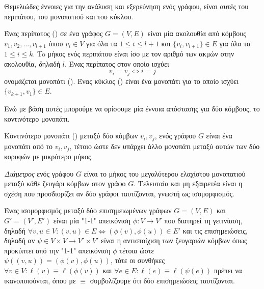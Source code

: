 Θεμελιώδες έννοιες για την ανάλυση και εξερεύνηση ενός γράφου, είναι αυτές του περιπάτου, του μονοπατιού και του κύκλου.
\begin{definition}
Ένας περίπατος () σε ένα γράφος $G = (V, E)$ είναι μία ακολουθία από κόμβους $v_{1}, v_{2}, \dots , v_{l + 1}$ όπου $v_{i} \in V$ για όλα τα $1 \leq i \leq l + 1$ και $\{ v_{i} , v_{i + 1} \} \in E$ για όλα τα
$1 \leq i \leq k$. To μήκος ενός περιπάτου είναι ίσο με τον αριθμό των ακμών στην ακολουθία, δηλαδή $l$.
Ένας περίπατος στον οποίο ισχύει $$v_{i} = v_{j} \Leftrightarrow i = j$$ ονομάζεται μονοπάτι ().
Ένας κύκλος () είναι ένα μονοπάτι για το οποίο ισχύει $\{v_{k + 1}, v_{1}\} \in E$.
\label{ref:path}
\end{definition}
Ενώ με βάση αυτές μπορούμε να ορίσουμε μία έννοια απόστασης για δύο κόμβους, το κοντινότερο μονοπάτι.
\begin{definition}
Κοντινότερο μονοπάτι () μεταξύ δύο κόμβων $v_{i}, v_{j}$, ενός γράφου $G$ είναι ένα μονοπάτι από
το $v_{i}, v_{j}$, τέτοιο ώστε δεν υπάρχει άλλο μονοπάτι μεταξύ αυτών των δύο κορυφών με μικρότερο μήκος.
\end{definition}
\textit{Διάμετρος} ενός γράφου $G$ είναι το μήκος του μεγαλύτερου ελαχίστου μονοπατιού μεταξύ κάθε ζευγάρι κόμβων στον γράφο $G$.
Τελευταία και μη εξαιρετέα είναι η σχέση που προσδιορίζει αν δύο γράφοι ταυτίζονται, γνωστή ως ισομορφισμός.
\begin{definition}[Ισομορφισμός]
Ένας ισομορφισμός μεταξύ δύο επισημειωμένων γράφων $G=(V,E)$ και $G'=(V',E')$ είναι μία "1-1" απεικόνιση $\phi : V \rightarrow V'$ που διατηρεί τη γειτνίαση, δηλαδή $\forall v,u \in V : (v,u) \in E \Leftrightarrow (\phi(v), \phi(u)) \in E'$ και τις επισημειώσεις, δηλαδή αν $\psi \in V \times V \rightarrow V' \times V'$ είναι η αντιστοίχιση των ζευγαριών κόμβων όπως προκύπτει από την "1-1" απεικόνιση $\phi$ τέτοια ώστε $\psi((v,u)) = (\phi(v), \phi(u))$, τότε οι συνθήκες $\forall v \in V : \ell(v) \equiv \ell(\phi(v))$ και $\forall e \in E : \ell(e) \equiv \ell(\psi(e))$ πρέπει να ικανοποιούνται, όπου με $\equiv$ συμβολίζουμε ότι δύο επισημειώσεις ταυτίζονται.
\label{def:isomorphism}
\end{definition}
